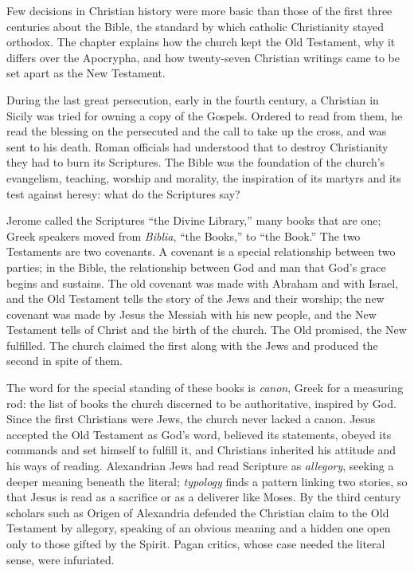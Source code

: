 
\begin{inbrief}
Few decisions in Christian history were more basic than those of the first three centuries about the
Bible, the standard by which catholic Christianity stayed orthodox. The chapter explains how the church
kept the Old Testament, why it differs over the Apocrypha, and how twenty-seven Christian writings
came to be set apart as the New Testament.
\end{inbrief}

During the last great persecution, early in the fourth century, a Christian in Sicily was tried for
owning a copy of the Gospels. Ordered to read from them, he read the blessing on the persecuted and the
call to take up the cross, and was sent to his death. Roman officials had understood that to destroy
Christianity they had to burn its Scriptures. The Bible was the foundation of the church's evangelism,
teaching, worship and morality, the inspiration of its martyrs and its test against heresy: what do
the Scriptures say?

Jerome called the Scriptures ``the Divine Library,'' many books that are one; Greek speakers moved
from \emph{Biblia}, ``the Books,'' to ``the Book.'' The two Testaments are two covenants. A covenant is
a special relationship between two parties; in the Bible, the relationship between God and man that
God's grace begins and sustains. The old covenant was made with Abraham and with Israel, and the Old
Testament tells the story of the Jews and their worship; the new covenant was made by Jesus the
Messiah with his new people, and the New Testament tells of Christ and the birth of the church. The
Old promised, the New fulfilled. The church claimed the first along with the Jews and produced the
second in spite of them.

The word for the special standing of these books is \emph{canon}, Greek for a measuring rod: the list
of books the church discerned to be authoritative, inspired by God. Since the first Christians were
Jews, the church never lacked a canon. Jesus accepted the Old Testament as God's word, believed its
statements, obeyed its commands and set himself to fulfill it, and Christians inherited his attitude
and his ways of reading. Alexandrian Jews had read Scripture as \emph{allegory}, seeking a deeper
meaning beneath the literal; \emph{typology} finds a pattern linking two stories, so that Jesus is
read as a sacrifice or as a deliverer like Moses. By the third century scholars such as Origen of
Alexandria defended the Christian claim to the Old Testament by allegory, speaking of an obvious
meaning and a hidden one open only to those gifted by the Spirit. Pagan critics, whose case needed
the literal sense, were infuriated.

